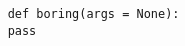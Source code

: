 \documentclass{article}
\begin{document}
  \begin{verbatim}
    def boring(args = None):
    pass
  \end{verbatim}
\end{document}

